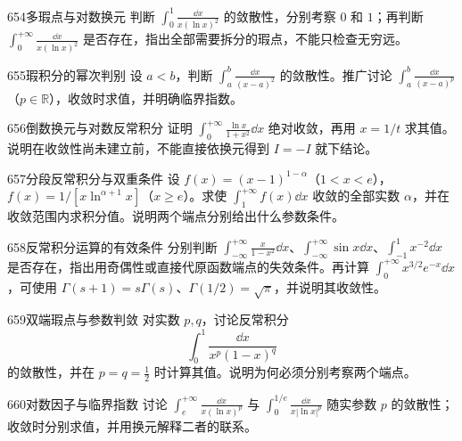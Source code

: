 \begin{exercise}{654}{多瑕点与对数换元}
判断 $\int_0^1\frac{\dd x}{x(\ln x)^2}$ 的敛散性，分别考察 $0$ 和 $1$；再判断 $\int_0^{+\infty}\frac{\dd x}{x(\ln x)^2}$ 是否存在，指出全部需要拆分的瑕点，不能只检查无穷远。
\end{exercise}
\begin{exercise}{655}{瑕积分的幂次判别}
设 $a<b$，判断 $\int_a^b\frac{\dd x}{(x-a)^2}$ 的敛散性。推广讨论 $\int_a^b\frac{\dd x}{(x-a)^p}$（$p\in\mathbb R$），收敛时求值，并明确临界指数。
\end{exercise}
\begin{exercise}{656}{倒数换元与对数反常积分}
证明 $\int_0^{+\infty}\frac{\ln x}{1+x^2}\dd x$ 绝对收敛，再用 $x=1/t$ 求其值。说明在收敛性尚未建立前，不能直接依换元得到 $I=-I$ 就下结论。
\end{exercise}
\begin{exercise}{657}{分段反常积分与双重条件}
设 $f(x)=(x-1)^{1-\alpha}$（$1<x<e$），$f(x)=1/[x\ln^{\alpha+1}x]$（$x\ge e$）。求使 $\int_1^{+\infty}f(x)\dd x$ 收敛的全部实数 $\alpha$，并在收敛范围内求积分值。说明两个端点分别给出什么参数条件。
\end{exercise}
\begin{exercise}{658}{反常积分运算的有效条件}
分别判断 $\int_{-\infty}^{+\infty}\frac{x}{1-x^2}\dd x$、$\int_{-\infty}^{+\infty}\sin x\dd x$、$\int_{-1}^1x^{-2}\dd x$ 是否存在，指出用奇偶性或直接代原函数端点的失效条件。再计算 $\int_0^{+\infty}x^{3/2}e^{-x}\dd x$，可使用 $\Gamma(s+1)=s\Gamma(s)$、$\Gamma(1/2)=\sqrt\pi$，并说明其收敛性。
\end{exercise}
\begin{exercise}{659}{双端瑕点与参数判敛}
对实数 $p,q$，讨论反常积分
\[
\int_0^1\frac{\dd x}{x^p(1-x)^q}
\]
的敛散性，并在 $p=q=\frac12$ 时计算其值。说明为何必须分别考察两个端点。
\end{exercise}
\begin{exercise}{660}{对数因子与临界指数}
讨论 $\int_e^{+\infty}\frac{\dd x}{x(\ln x)^p}$ 与 $\int_0^{1/e}\frac{\dd x}{x|\ln x|^p}$ 随实参数 $p$ 的敛散性；收敛时分别求值，并用换元解释二者的联系。
\end{exercise}
